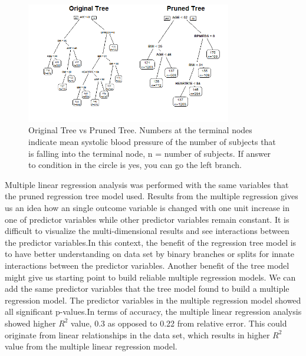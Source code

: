 \documentclass{article}\usepackage[]{graphicx}\usepackage[]{color}
\begin{document}
\begin{figure}[ht]
\begin{center}
    \centering
    \includegraphics[width=0.8\textwidth]{Comparison_tree.png}
    \caption{Original Tree vs Pruned Tree. Numbers at the terminal nodes indicate mean systolic blood pressure of the number of subjects that is falling into the terminal node, n = number of subjects. If answer to condition in the circle is yes, you can go the left branch.} 
    \label{Figure 2.}
\end{center}
\end{figure}



 

Multiple linear regression analysis was performed with the same variables that the pruned regression tree model used. Results from the multiple regression gives us an idea how an single outcome variable is changed with one unit increase in one of predictor variables while other predictor variables remain constant. It is difficult to visualize the multi-dimensional results and see interactions between the predictor variables.In this context, the benefit of the regression tree model is to have better understanding on data set by binary branches or splits for innate interactions between the predictor variables. Another benefit of the tree model might give us starting point to build reliable multiple regression models. We can add the same predictor variables that the tree model found to build a multiple regression model. The predictor variables in the multiple regression model showed all significant p-values.In terms of accuracy, the multiple linear regression analysis showed higher $R^2$ value, 0.3 as opposed to 0.22 from relative error. This could originate from linear relationships in the data set, which results in higher $R^2$ value from the multiple linear regression model. 
\end{document}
